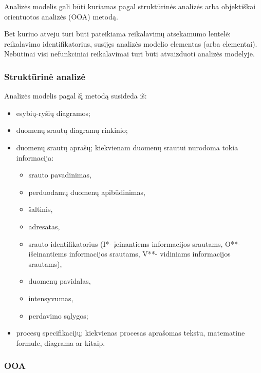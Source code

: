 \documentclass[12pt,a4paper]{article}
\begin{document}
Analizės modelis gali būti kuriamas pagal struktūrinės analizės arba objektiškai orientuotos analizės (OOA) metodą.

Bet kuriuo atveju turi būti pateikiama reikalavimų atsekamumo lentelė: reikalavimo identifikatorius, susijęs analizės modelio elementas (arba elementai). Nebūtinai visi nefunkciniai reikalavimai turi būti atvaizduoti analizės modelyje.

\subsubsection*{Struktūrinė analizė}

Analizės modelis pagal šį metodą susideda iš:
\begin{itemize}
    \item esybių-ryšių diagramos;
    \item duomenų srautų diagramų rinkinio;
    \item duomenų srautų aprašų; kiekvienam duomenų srautui nurodoma tokia informacija:
    \begin{itemize}
        \item srauto pavadinimas,
        \item perduodamų duomenų apibūdinimas,
        \item šaltinis,
        \item adresatas,
        \item srauto identifikatorius (I*- įeinantiems informacijos srautams, O**- išeinantiems informacijos srautams, V**- vidiniams informacijos srautams),
        \item duomenų pavidalas,
        \item intensyvumas,
        \item perdavimo sąlygos;
    \end{itemize}
    \item procesų specifikacijų; kiekvienas procesas aprašomas tekstu, matematine formule, diagrama ar kitaip.
\end{itemize}

\subsubsection*{OOA}
\end{document}
